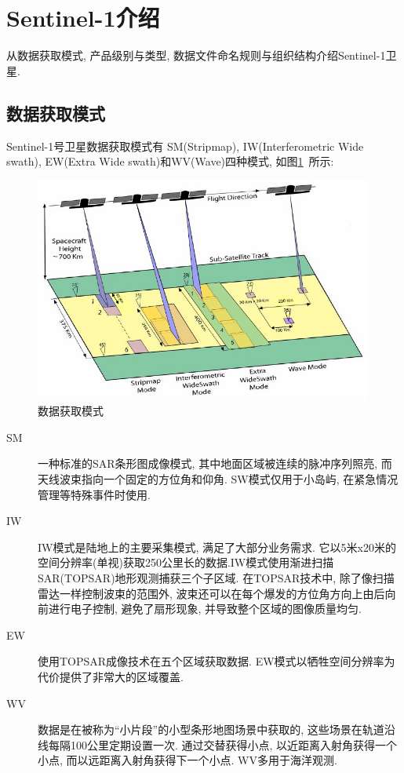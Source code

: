 \section{Sentinel-1介绍}

从数据获取模式, 产品级别与类型, 数据文件命名规则与组织结构介绍Sentinel-1卫星. 

\subsection{数据获取模式}
Sentinel-1号卫星数据获取模式有 SM(Stripmap), IW(Interferometric Wide swath), EW(Extra Wide swath)和WV(Wave)四种模式, 如图\ref{fig:0201}~所示:
\begin{figure}[htbp]
    \centering
    \includegraphics[height=20em]{pic/chap02xx01.jpg}
    \caption{数据获取模式}
    \label{fig:0201}
\end{figure}

\begin{description}
    \item[SM] 一种标准的SAR条形图成像模式, 其中地面区域被连续的脉冲序列照亮, 而天线波束指向一个固定的方位角和仰角. SW模式仅用于小岛屿, 在紧急情况管理等特殊事件时使用.
    \item[IW] IW模式是陆地上的主要采集模式, 满足了大部分业务需求. 它以5米x20米的空间分辨率(单视)获取250公里长的数据.IW模式使用渐进扫描SAR(TOPSAR)地形观测捕获三个子区域. 在TOPSAR技术中, 除了像扫描雷达一样控制波束的范围外, 波束还可以在每个爆发的方位角方向上由后向前进行电子控制, 避免了扇形现象, 并导致整个区域的图像质量均匀.
    \item[EW] 使用TOPSAR成像技术在五个区域获取数据. EW模式以牺牲空间分辨率为代价提供了非常大的区域覆盖.
    \item[WV] 数据是在被称为``小片段''的小型条形地图场景中获取的, 这些场景在轨道沿线每隔100公里定期设置一次. 通过交替获得小点, 以近距离入射角获得一个小点, 而以远距离入射角获得下一个小点. WV多用于海洋观测. 
\end{description}

